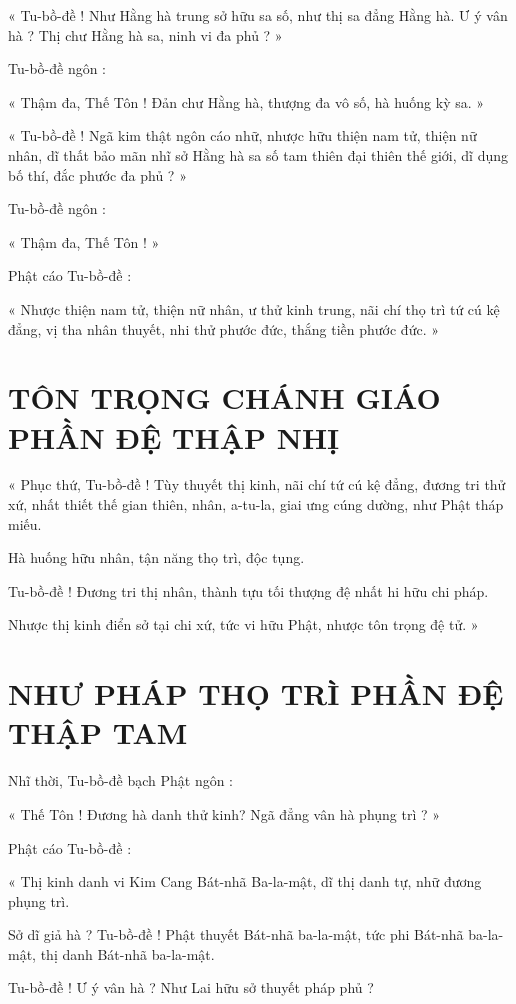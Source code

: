 	« Tu-bồ-đề ! Như Hằng hà trung sở hữu sa số, như thị sa đẳng Hằng hà. Ư ý vân hà ? Thị chư Hằng hà sa, ninh vi đa phủ ? »
	
	Tu-bồ-đề ngôn :
	
	« Thậm đa, Thế Tôn ! Đản chư Hằng hà, thượng đa vô số, hà huống kỳ sa. »
	
	« Tu-bồ-đề ! Ngã kim thật ngôn cáo nhữ, nhược hữu thiện nam tử, thiện nữ nhân, dĩ thất bảo mãn nhĩ sở Hằng hà sa số tam thiên đại thiên thế giới, dĩ dụng bố thí, đắc phước đa phủ ? »
	
	Tu-bồ-đề ngôn :
	
	« Thậm đa, Thế Tôn ! »
	
	Phật cáo Tu-bồ-đề :
	
	« Nhược thiện nam tử, thiện nữ nhân, ư thử kinh trung, nãi chí thọ trì tứ cú kệ đẳng, vị tha nhân thuyết, nhi thử phước đức, thắng tiền phước đức. »
	
	\section*{TÔN TRỌNG CHÁNH GIÁO PHẦN ĐỆ THẬP NHỊ}
	
	« Phục thứ, Tu-bồ-đề ! Tùy thuyết thị kinh, nãi chí tứ cú kệ đẳng, đương tri thử xứ, nhất thiết thế gian thiên, nhân, a-tu-la, giai ưng cúng dường, như Phật tháp miếu. 
	
	Hà huống hữu nhân, tận năng thọ trì, độc tụng. 
	
	Tu-bồ-đề ! Đương tri thị nhân, thành tựu tối thượng đệ nhất hi hữu chi pháp. 
	
	Nhược thị kinh điển sở tại chi xứ, tức vi hữu Phật, nhược tôn trọng đệ tử. »
	
	\section*{NHƯ PHÁP THỌ TRÌ PHẦN ĐỆ THẬP TAM}
	
	Nhĩ thời, Tu-bồ-đề bạch Phật ngôn :
	
	« Thế Tôn ! Đương hà danh thử kinh? Ngã đẳng vân hà phụng trì ? »
	
	Phật cáo Tu-bồ-đề :
	
	« Thị kinh danh vi Kim Cang Bát-nhã Ba-la-mật, dĩ thị danh tự, nhữ đương phụng trì. 
	
	Sở dĩ giả hà ? Tu-bồ-đề ! Phật thuyết Bát-nhã ba-la-mật, tức phi Bát-nhã ba-la-mật, thị danh Bát-nhã ba-la-mật. 
	
	Tu-bồ-đề ! Ư ý vân hà ? Như Lai hữu sở thuyết pháp phủ ?
	
